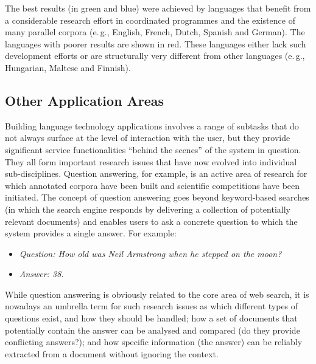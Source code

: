 \documentclass[]{../../metanetpaper}
\begin{document}
\begin{multicols}{2}
The best results (in green and blue) were achieved by languages that benefit from a considerable research effort in coordinated programmes and the existence of many parallel corpora (e.\,g., English, French, Dutch, Spanish and German). The languages with poorer results are shown in red. These languages either lack such development efforts or are structurally very different from other languages (e.\,g., Hungarian, Maltese and Finnish).

\subsection{Other Application Areas}

Building language technology applications involves a range of subtasks that do not always surface at the level of interaction with the user, but they provide significant service functionalities “behind the scenes” of the system in question. They all form important research issues that have now evolved into individual sub-disciplines. Question answering, for example, is an active area of research for which annotated corpora have been built and scientific competitions have been initiated. The concept of question answering goes beyond keyword-based searches (in which the search engine responds by delivering a collection of potentially relevant documents) and enables users to ask a concrete question to which the system provides a single answer. For example:

\begin{itemize}
\item[] \textit{Question: How old was Neil Armstrong when he stepped on the moon?}
\item[] \textit{Answer: 38.}
\end{itemize}

While question answering is obviously related to the core area of web search, it is nowadays an umbrella term for such research issues as which different types of questions exist, and how they should be handled; how a set of documents that potentially contain the answer can be analysed and compared (do they provide conflicting answers?); and how specific information (the answer) can be reliably extracted from a document without ignoring the context. 



\end{multicols}
\end{document}
